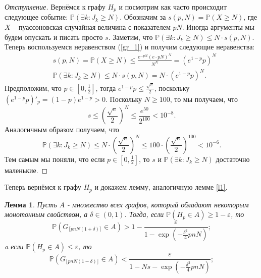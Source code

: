 \documentclass{matmex-diploma-custom}
\newcommand{\PRob}{\mathbb P}
\newcommand{\leqs}{\leqslant}
\newcommand{\geqs}{\geqslant}
\newcommand{\eps}{\varepsilon}
\newtheorem{lemma}{Лемма}
\theoremstyle{named}
\begin{document}
\begin{proof}[Отступление]
Вернёмся к графу $H_p$ и посмотрим как часто происходит следующее событие: $\PRob(\exists k : J_k \geqs N)$.
Обозначим за $s(p, N) = \PRob(X \geqs N)$, где $X$ -- пуассоновская случайная величина с показателем $pN$.
Иногда аргументы мы будем опускать и писать просто $s$.
Заметим, что $\PRob(\exists k : J_k \geqs N) \leqs N \cdot s(p, N)$. 
Теперь воспользуемся неравенством (\ref{gr_1}) и получим следующие неравенства:
\begin{align}\label{ot_1}
&s(p,N) = \PRob(X \geqs N) \leqs \frac{e^{-pN}(e\cdot pN)^N}{N^N} = (e^{1-p} p )^N 
\\ \label{s_1}
&\PRob(\exists k : J_k \geqs N) \leqs N \cdot s(p, N) = N \cdot (e^{1-p} p )^N.
\end{align} 
Предположим, что $p \in [0, \frac{1}{2}]$, тогда $e^{1-p} p \leqs \frac{\sqrt{e}}{2}$, 
поскольку $(e^{1-p} p)'_p = (1-p) e^{1-p} > 0$. Поскольку $N \geqs 100$, то мы получаем, что 
\begin{equation}
s \leqs \left(\frac{\sqrt{e}}{2}\right)^N \leqs \frac{e^{50}}{2^{100}} < 10^{-8}.
\end{equation}
Аналогичным образом получаем, что 
\begin{equation}
\PRob(\exists k : J_k \geqs N) \leqs N \cdot \left(\frac{\sqrt{e}}{2}\right)^N
\leqs 100 \cdot \left(\frac{\sqrt{e}}{2}\right)^{100} < 10^{-6}.
\end{equation}
Тем самым мы поняли, что если $p \in [0, \frac{1}{2}]$, то $s$ и $\PRob(\exists k : J_k \geqs N)$ достаточно маленькие.
\end{proof}

Теперь вернёмся к графу $H_p$ и докажем лемму, аналогичную лемме \ref{l1}.

\begin{lemma} \label{l3}
Пусть $A$ - множество всех графов, который обладают некоторым монотонным свойством, а $\delta \in (0,1)$.
Тогда, если $\PRob( H_p \in A) \geqs 1 - \eps$, то
\begin{equation} \label{l3_1}
\PRob(G_{\lceil pnN(1+\delta) \rceil} \in A) > 1 - \frac{\eps}{1 - \exp\left(-\frac{\delta^2}{4}pnN\right)};
\end{equation}
a если $\PRob( H_p \in A) \leqs \eps$, то
\begin{equation}\label{l3_2}
\PRob(G_{\lfloor pnN(1-\delta) \rfloor} \in A) < \frac{\eps}{1 - Ns - \exp\left(-\frac{\delta^2}{4}pnN\right)};
\end{equation}
\end{lemma}
\end{document}
